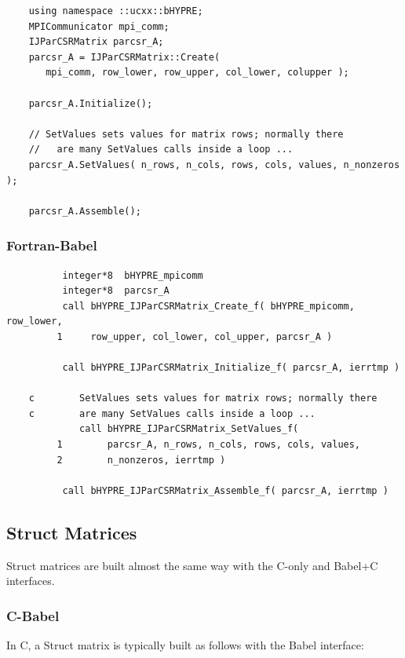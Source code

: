 \begin{verbatim}
    using namespace ::ucxx::bHYPRE;
    MPICommunicator mpi_comm;
    IJParCSRMatrix parcsr_A;
    parcsr_A = IJParCSRMatrix::Create(
       mpi_comm, row_lower, row_upper, col_lower, colupper );

    parcsr_A.Initialize();

    // SetValues sets values for matrix rows; normally there
    //   are many SetValues calls inside a loop ...
    parcsr_A.SetValues( n_rows, n_cols, rows, cols, values, n_nonzeros );

    parcsr_A.Assemble();
\end{verbatim}


\subsubsection{Fortran-Babel}
\begin{verbatim}
          integer*8  bHYPRE_mpicomm
          integer*8  parcsr_A
          call bHYPRE_IJParCSRMatrix_Create_f( bHYPRE_mpicomm, row_lower,
         1     row_upper, col_lower, col_upper, parcsr_A )

          call bHYPRE_IJParCSRMatrix_Initialize_f( parcsr_A, ierrtmp )

    c        SetValues sets values for matrix rows; normally there
    c        are many SetValues calls inside a loop ...
             call bHYPRE_IJParCSRMatrix_SetValues_f(
         1        parcsr_A, n_rows, n_cols, rows, cols, values,
         2        n_nonzeros, ierrtmp )

          call bHYPRE_IJParCSRMatrix_Assemble_f( parcsr_A, ierrtmp )
\end{verbatim}



\subsection{Struct Matrices}

Struct matrices are built almost the same way with
the C-only and Babel+C interfaces.

\subsubsection{C-Babel}

In C, a Struct  matrix is typically built as follows with
the Babel interface:

